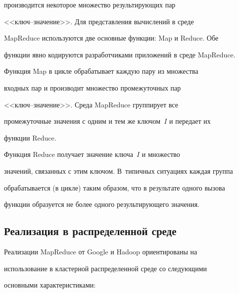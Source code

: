 производится некоторое множество результирующих пар 


      <<ключ--зна\-че\-ние>>. Для представления вычислений в среде 


MapReduce используются две основные функции: Map и Reduce. Обе 


функции явно кодируются разработчиками приложений в среде MapReduce. 


      


      Функция Map в цикле обрабатывает каждую пару из множества 


входных пар и производит множество промежуточных пар 


      <<ключ--зна\-че\-ние>>. Среда MapReduce группирует все 


промежуточные значения с одним и тем же ключом~$I$ и передает их 


функции Reduce. 


      


      Функция Reduce получает значение ключа~$I$ и множество 


значений, связанных с этим ключом. В~типичных ситуациях каждая группа 


обрабатывается (в цикле) таким образом, что в результате одного вызова 


функции образуется не более одного результирующего значения. 





\subsection{Реализация в распределенной среде}





      Реализации MapReduce от Google и Hadoop ориентированы на 


использование в кластерной распределенной среде со следующими 


основными характерис\-ти\-ками: 


